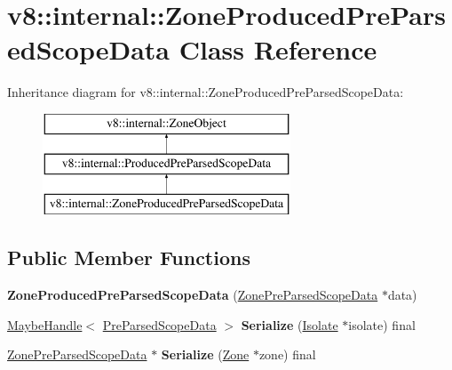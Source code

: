 \hypertarget{classv8_1_1internal_1_1ZoneProducedPreParsedScopeData}{}\section{v8\+:\+:internal\+:\+:Zone\+Produced\+Pre\+Parsed\+Scope\+Data Class Reference}
\label{classv8_1_1internal_1_1ZoneProducedPreParsedScopeData}
Inheritance diagram for v8\+:\+:internal\+:\+:Zone\+Produced\+Pre\+Parsed\+Scope\+Data\+:\begin{figure}[H]
\begin{center}
\leavevmode
\includegraphics[height=3.000000cm]{classv8_1_1internal_1_1ZoneProducedPreParsedScopeData}
\end{center}
\end{figure}
\subsection*{Public Member Functions}
\begin{DoxyCompactItemize}
\item 
\mbox{\label{classv8_1_1internal_1_1ZoneProducedPreParsedScopeData_a29139a3dac5514b01a549bdc97dd593b}} 
{\bfseries Zone\+Produced\+Pre\+Parsed\+Scope\+Data} (\mbox{\hyperlink{classv8_1_1internal_1_1ZonePreParsedScopeData}{Zone\+Pre\+Parsed\+Scope\+Data}} $\ast$data)
\item 
\mbox{\label{classv8_1_1internal_1_1ZoneProducedPreParsedScopeData_a30212237706553042733aebd7524708b}} 
\mbox{\hyperlink{classv8_1_1internal_1_1MaybeHandle}{Maybe\+Handle}}$<$ \mbox{\hyperlink{classv8_1_1internal_1_1PreParsedScopeData}{Pre\+Parsed\+Scope\+Data}} $>$ {\bfseries Serialize} (\mbox{\hyperlink{classv8_1_1internal_1_1Isolate}{Isolate}} $\ast$isolate) final
\item 
\mbox{\label{classv8_1_1internal_1_1ZoneProducedPreParsedScopeData_a904b19d78c589a02af4a0603809da8b0}} 
\mbox{\hyperlink{classv8_1_1internal_1_1ZonePreParsedScopeData}{Zone\+Pre\+Parsed\+Scope\+Data}} $\ast$ {\bfseries Serialize} (\mbox{\hyperlink{classv8_1_1internal_1_1Zone}{Zone}} $\ast$zone) final
\end{DoxyCompactItemize}
